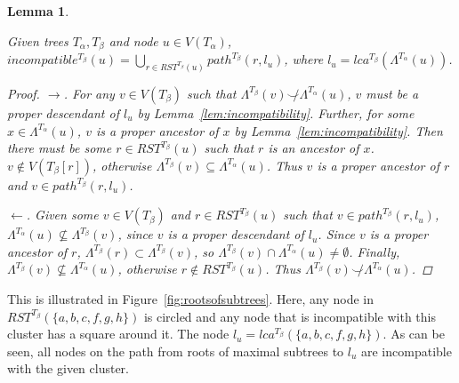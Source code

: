 \documentclass{article}
\newcommand{\compatible}{\smile}
\newcommand{\leafset}{\Lambda}
\newcommand{\TA}{T_\alpha}
\newcommand{\TB}{T_\beta}
\newtheorem{incompatibilityrootsofsubtrees}[incompatibility]{Lemma}
\begin{document}
    \begin{incompatibilityrootsofsubtrees}
        \label{lem:incompatibilityrootsofsubtrees}

        Given trees $\TA, \TB$ and node $u \in V(\TA)$, $incompatible^{\TB}(u) = \bigcup_{r \in RST^{\TB}(u)} path^{\TB}(r, l_u)$, where $l_u = lca^{\TB}(\leafset^{\TA}(u))$.

        \begin{proof}
            $\longrightarrow$. For any $v \in V(\TB)$ such that $\leafset^{\TB}(v) \not\compatible \leafset^{\TA}(u)$, $v$ must be a proper descendant of $l_u$ by Lemma~\ref{lem:incompatibility}. Further, for some $x \in \leafset^{\TA}(u)$, $v$ is a proper ancestor of $x$ by Lemma~\ref{lem:incompatibility}. Then there must be some $r \in RST^{\TB}(u)$ such that $r$ is an ancestor of $x$. $v \not\in V(\TB[r])$, otherwise $\leafset^{\TB}(v) \subseteq \leafset^{\TA}(u)$. Thus $v$ is a proper ancestor of $r$ and $v \in path^{\TB}(r, l_u)$.

            $\longleftarrow$. Given some $v \in V(\TB)$ and $r \in RST^{\TB}(u)$ such that $v \in path^{\TB}(r, l_u)$, $\leafset^{\TA}(u) \not\subseteq \leafset^{\TB}(v)$, since $v$ is a proper descendant of $l_u$. Since $v$ is a proper ancestor of $r$, $\leafset^{\TB}(r) \subset \leafset^{\TB}(v)$, so $\leafset^{\TB}(v) \cap \leafset^{\TA}(u) \neq \emptyset$. Finally, $\leafset^{\TB}(v) \not\subseteq \leafset^{\TA}(u)$, otherwise $r \not\in RST^{\TB}(u)$. Thus $\leafset^{\TB}(v) \not\compatible \leafset^{\TA}(u)$.
        \end{proof}
    \end{incompatibilityrootsofsubtrees}

    This is illustrated in Figure~\ref{fig:rootsofsubtrees}. Here, any node in $RST^{\TB}(\{a, b, c, f, g, h\})$ is circled and any node that is incompatible with this cluster has a square around it. The node $l_u = lca^{\TB}(\{a, b, c, f, g, h\})$. As can be seen, all nodes on the path from roots of maximal subtrees to $l_u$ are incompatible with the given cluster.
\end{document}

